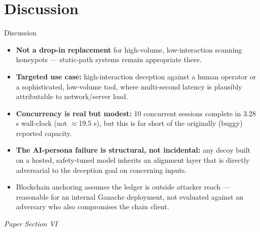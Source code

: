 \documentclass[aspectratio=169, 11pt]{beamer}
\newcommand{\srcnote}[1]{{\footnotesize\color{gray}\textit{#1}}}
\begin{document}
\section{Discussion}
\begin{frame}{Discussion}
    \begin{itemize}
        \item \textbf{Not a drop-in replacement} for high-volume, low-interaction scanning honeypots --- static-path systems remain appropriate there.
        \item \textbf{Targeted use case:} high-interaction deception against a human operator or a sophisticated, low-volume tool, where multi-second latency is plausibly attributable to network/server load.
        \item \textbf{Concurrency is real but modest:} 10 concurrent sessions complete in 3.28 s wall-clock (not $\approx$19.5 s), but this is far short of the originally (buggy) reported capacity.
        \item \textbf{The AI-persona failure is structural, not incidental:} any decoy built on a hosted, safety-tuned model inherits an alignment layer that is directly adversarial to the deception goal on concerning inputs.
        \item Blockchain anchoring assumes the ledger is outside attacker reach --- reasonable for an internal Ganache deployment, not evaluated against an adversary who also compromises the chain client.
    \end{itemize}
    \srcnote{Paper Section VI}
\end{frame}

\end{document}
